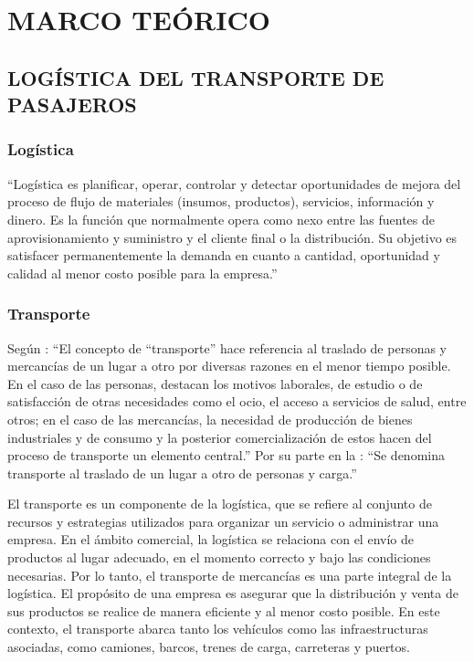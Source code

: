 \chapter{MARCO TEÓRICO} 
	
	\vspace{0pt}
	
	\section{LOGÍSTICA DEL TRANSPORTE DE PASAJEROS}
	\subsection{Logística}
		``Logística es planificar, operar, controlar y detectar oportunidades de mejora del proceso de flujo de materiales (insumos, productos), servicios, información y dinero.  Es la función que normalmente opera como nexo entre las fuentes de aprovisionamiento y suministro y el cliente final o la distribución.  Su objetivo es satisfacer permanentemente la demanda en cuanto a cantidad, oportunidad y calidad al menor costo posible para la empresa.''\parencite{carro2013logistica}
	\subsection{Transporte}
		Según \textcite{koch2001transporte}: ``El concepto de “transporte” hace referencia al traslado de personas y mercancías de un lugar a otro por diversas razones en el menor tiempo posible. En el caso de las personas, destacan los motivos laborales, de estudio o de satisfacción de otras necesidades como el ocio, el acceso a servicios de salud, entre otros; en
		el caso de las mercancías, la necesidad de producción de bienes industriales y de consumo y la posterior comercialización de estos hacen del proceso de transporte un elemento central.'' Por su parte en la \textcite{ley2011transporte}: ``Se denomina transporte al traslado de un lugar a otro de personas y carga.''
		
		
		El transporte es un componente de la logística, que se refiere al conjunto de recursos y estrategias utilizados para organizar un servicio o administrar una empresa. En el ámbito comercial, la logística se relaciona con el envío de productos al lugar adecuado, en el momento correcto y bajo las condiciones necesarias. Por lo tanto, el transporte de mercancías es una parte integral de la logística. El propósito de una empresa es asegurar que la distribución y venta de sus productos se realice de manera eficiente y al menor costo posible. En este contexto, el transporte abarca tanto los vehículos como las infraestructuras asociadas, como camiones, barcos, trenes de carga, carreteras y puertos.
		
